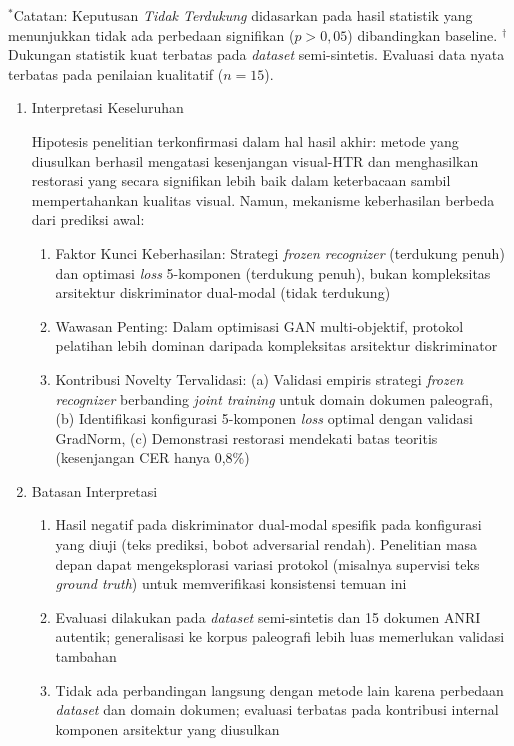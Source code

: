 \documentclass[12pt,a4paper]{article}
\begin{document}
\small $^*$Catatan: Keputusan \textit{Tidak Terdukung} didasarkan pada hasil statistik yang menunjukkan tidak ada perbedaan signifikan ($p>0,05$) dibandingkan baseline.
\newline
$^{\dagger}$Dukungan statistik kuat terbatas pada \textit{dataset} semi-sintetis. Evaluasi data nyata terbatas pada penilaian kualitatif ($n=15$).
\normalsize

\begin{enumerate}[leftmargin=1.5em, labelsep=0.5em, itemindent=0pt, label=\arabic*., topsep=0pt, partopsep=0pt]
    \item Interpretasi Keseluruhan
    
    Hipotesis penelitian terkonfirmasi dalam hal hasil akhir: metode yang diusulkan berhasil mengatasi kesenjangan visual-HTR dan menghasilkan restorasi yang secara signifikan lebih baik dalam keterbacaan sambil mempertahankan kualitas visual. Namun, mekanisme keberhasilan berbeda dari prediksi awal:

    \begin{enumerate}[leftmargin=1.5em, labelsep=0.5em, itemindent=0pt, noitemsep, topsep=0pt, label=\alph*)]
        \item Faktor Kunci Keberhasilan: Strategi \textit{frozen recognizer} (terdukung penuh) dan optimasi \textit{loss} 5-komponen (terdukung penuh), bukan kompleksitas arsitektur diskriminator dual-modal (tidak terdukung)
        \item Wawasan Penting: Dalam optimisasi GAN multi-objektif, protokol pelatihan lebih dominan daripada kompleksitas arsitektur diskriminator
        \item Kontribusi Novelty Tervalidasi: (a) Validasi empiris strategi \textit{frozen recognizer} berbanding \textit{joint training} untuk domain dokumen paleografi, (b) Identifikasi konfigurasi 5-komponen \textit{loss} optimal dengan validasi GradNorm, (c) Demonstrasi restorasi mendekati batas teoritis (kesenjangan CER hanya 0,8\%)
    \end{enumerate}

    \item Batasan Interpretasi
    
    \begin{enumerate}[leftmargin=1.5em, labelsep=0.5em, itemindent=0pt, noitemsep, topsep=0pt, label=\alph*)]
        \item Hasil negatif pada diskriminator dual-modal spesifik pada konfigurasi yang diuji (teks prediksi, bobot adversarial rendah). Penelitian masa depan dapat mengeksplorasi variasi protokol (misalnya supervisi teks \textit{ground truth}) untuk memverifikasi konsistensi temuan ini
        \item Evaluasi dilakukan pada \textit{dataset} semi-sintetis dan 15 dokumen ANRI autentik; generalisasi ke korpus paleografi lebih luas memerlukan validasi tambahan
        \item Tidak ada perbandingan langsung dengan metode lain karena perbedaan \textit{dataset} dan domain dokumen; evaluasi terbatas pada kontribusi internal komponen arsitektur yang diusulkan
    \end{enumerate}


\end{enumerate}
\end{document}
